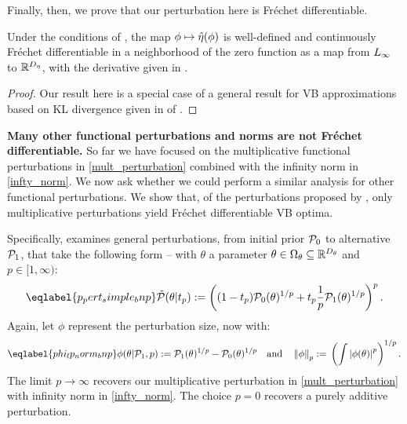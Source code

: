 Finally, then, we prove that our perturbation here is Fr{\'e}chet differentiable.

\begin{thm}
%
Under the conditions of , the map $\phi \mapsto \hat\eta(\phi)$
is well-defined and continuously Fr{\'e}chet differentiable in a neighborhood of
the zero function as a map from ${L_{\infty}}$ to $\mathbb{R}^{D_{\eta}}$,
with the derivative given in . \end{thm}
%
\begin{proof}
%
Our result here is a special case of a general result for VB approximations
based on KL divergence given in  of
.
%
\end{proof}

\noindent \textbf{Many other functional perturbations and norms are not Fr{\'e}chet differentiable.}
%
So far we have focused on the multiplicative functional perturbations in
\eqref{mult_perturbation} combined with the infinity norm in \eqref{infty_norm}.
We now ask whether we could perform a similar analysis for other functional
perturbations. We show that, of the perturbations proposed by
\citet{gustafson:1996:local}, only multiplicative perturbations yield
Fr{\'e}chet differentiable VB optima.

Specifically, \citet{gustafson:1996:local} examines general perturbations, from
initial prior $\mathcal{P}_{0}$ to alternative $\mathcal{P}_{1}$, that take the following form --
with $\theta$ a parameter $\theta \in \Omega_{\theta} \subseteq
\mathbb{R}^{{D_{\theta}}}$ and $p \in [1, \infty)$:
%
\begin{align}\eqlabel{p_pert_simple_bnp}
%
\ptil(\theta \vert \tp) :=
    \left((1 - \tp)\pbase(\theta)^{1/p} +
    \tp \frac{1}{p}\palt(\theta)^{1/p} \right)^{p}.
%
\end{align}
%
Again, let $\phi$ represent the perturbation size, now with:
%
\begin{align}\eqlabel{phi_lp_norm_bnp}
%
\phi(\theta \vert \palt, p) :={}
    \palt(\theta)^{1/p} - \pbase(\theta)^{1/p} \mathand
\norm{\phi}_p :={} \left(\int \abs{\phi(\theta)}^p \right)^{1/p}.
%
\end{align}
%
The limit $p \rightarrow \infty$ recovers our multiplicative perturbation in
\eqref{mult_perturbation} with infinity norm in \eqref{infty_norm}. The choice
$p=0$ recovers a purely additive perturbation.

